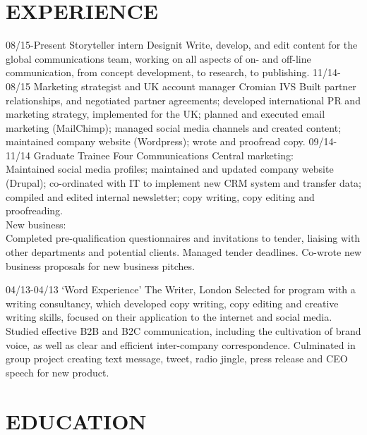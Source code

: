 \documentclass[]{friggeri-cv}
\begin{document}
\section{EXPERIENCE}

\begin{entrylist}
	 \entry
	 {08/15-Present}
	 {Storyteller intern}
	 {Designit}
	 {Write, develop, and edit content for the global communications team, working on all aspects of on- and off-line communication, from concept development, to research, to publishing. }
  \entry
  {11/14-08/15}
  {Marketing strategist and UK account manager}
  {Cromian IVS}
  {Built partner relationships, and negotiated partner agreements; developed international PR and marketing strategy, implemented for the UK; planned and executed email marketing (MailChimp); managed social media channels and created content; maintained company website (Wordpress); wrote and proofread copy.}
  \entry
  {09/14-11/14}
  {Graduate Trainee}
  {Four Communications}
  {Central marketing:\\
  	Maintained social media profiles; maintained and updated company website (Drupal); co-ordinated with IT to implement new CRM system and transfer data; compiled and edited internal newsletter; copy writing, copy editing and proofreading. \\
  	
  	New business:\\
  	Completed pre-qualification questionnaires and invitations to tender, liaising with other departments and potential clients. Managed tender deadlines. Co-wrote new business proposals for new business pitches.}
  
  \entry
  {04/13-04/13}
  {‘Word Experience’}
  {The Writer, London}
  {Selected for program with a writing consultancy, which developed copy writing, copy editing and creative writing skills, focused on their application to the internet and social media. Studied effective B2B and B2C communication, including the cultivation of brand voice, as well as clear and efficient inter-company correspondence. Culminated in group project creating text message, tweet, radio jingle, press release and CEO speech for new product.}
 
\end{entrylist}

\pagebreak

\section{EDUCATION}
\end{document}
